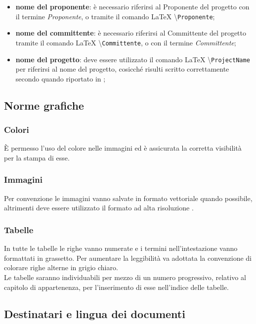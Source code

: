 \begin{itemize}
	\item \textbf{nome del proponente}: è necessario riferirsi al Proponente del progetto con il termine \textit{Proponente}, o tramite il comando \LaTeX{} \textbackslash{\texttt{Proponente}};
	\item \textbf{nome del committente}: è necessario riferirsi al Committente del progetto tramite il comando \LaTeX{} \textbackslash{\texttt{Committente}}, o con il termine \textit{Committente};
	\item \textbf{nome del progetto}: deve essere utilizzato il comando \LaTeX{} \textbackslash{\texttt{ProjectName}} per riferirsi al nome del progetto, cosicché risulti scritto correttamente secondo quando riportato in ;
\end{itemize}

\subsection{Norme grafiche}
\subsubsection{Colori}
È permesso l'uso del colore nelle immagini ed è assicurata la corretta visibilità per la stampa di esse.

\subsubsection{Immagini}
Per convenzione le immagini vanno salvate in formato vettoriale  quando possibile, altrimenti deve essere utilizzato il formato ad alta risoluzione .

\subsubsection{Tabelle}
In tutte le tabelle le righe vanno numerate e i termini nell'intestazione vanno formattati in grassetto.
Per aumentare la leggibilità va adottata la convenzione di colorare righe alterne in grigio chiaro.\\
Le tabelle saranno individuabili per mezzo di un numero progressivo, relativo al capitolo di appartenenza, per l'inserimento di esse nell'indice delle tabelle.

\subsection{Destinatari e lingua dei documenti}
